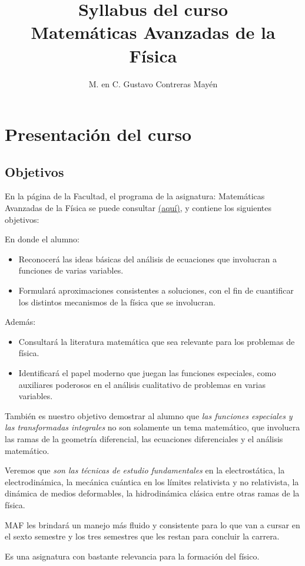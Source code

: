 
\usepackage{apacite}
\title{Syllabus del curso \\[0.3em]  \large{Matemáticas Avanzadas de la Física}\vspace{-3ex}}
\author{M. en C. Gustavo Contreras Mayén}
\date{ }


\vspace{-4cm}
\maketitle
\fontsize{14}{14}\selectfont
\tableofcontents
\newpage

\section{Presentación del curso}

\subsection{Objetivos}

En la página de la Facultad, el programa de la asignatura: Matemáticas Avanzadas de la Física se puede consultar \href{http://www.fciencias.unam.mx/asignaturas/610.pdf}{(aquí)}, y contiene los siguientes objetivos:
\par
\noindent
En donde el alumno:
\begin{itemize}
\setlength{\itemsep}{0mm}
\item Reconocerá las ideas básicas del análisis de ecuaciones que involucran a funciones de varias variables.
\item Formulará aproximaciones consistentes a soluciones, con el fin de cuantificar los distintos mecanismos de la física que se involucran.
\end{itemize}

Además:
\begin{itemize}
\setlength{\itemsep}{0mm}
\item Consultará la literatura matemática que sea relevante para los problemas de física.
\item Identificará el papel moderno que juegan las funciones especiales, como auxiliares poderosos en el análisis cualitativo de problemas en varias variables.
\end{itemize}

También es nuestro objetivo demostrar al alumno que \emph{las funciones especiales y las transformadas integrales} no son solamente un tema matemático, que involucra las ramas de la geometría diferencial, las ecuaciones diferenciales y el análisis matemático.
\par
Veremos que \emph{son las técnicas de estudio fundamentales} en la electrostática, la electrodinámica, la mecánica cuántica en los límites relativista y no relativista, la dinámica de medios deformables, la hidrodinámica clásica entre otras ramas de la física.
\par
MAF les brindará un manejo más fluido y consistente para lo que van a cursar en el sexto semestre y los tres semestres que les restan para concluir la carrera.
\par
Es una asignatura con bastante relevancia para la formación del físico.

